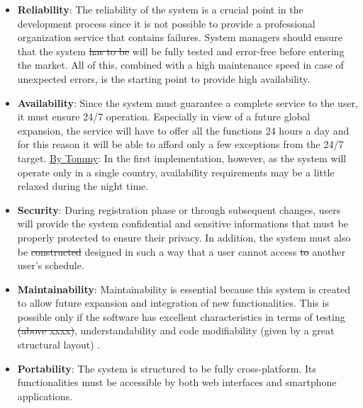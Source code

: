 \begin{itemize}
	\item \textbf{Reliability}: The reliability of the system is a crucial point in the development process since it is not possible to provide a professional organization service that contains failures. System managers should ensure that the system \st{has to be} will be fully tested and error-free before entering the market. All of this, combined with a high maintenance speed in case of unexpected errors, is the starting point to provide high availability.
	\item \textbf{Availability}: Since the system must guarantee a complete service to the user, it must ensure 24/7 operation. Especially in view of a future global expansion, the service will have to offer all the functions 24 hours a day and for this reason it will be able to afford only a few exceptions from the 24/7 target. \underline{By Tommy}: In the first implementation, however, as the system will operate only in a single country, availability requirements may be a little relaxed during the night time.
	\item \textbf{Security}: During registration phase or through subsequent changes, users will provide the system confidential and sensitive informations that must be properly protected to ensure their privacy. In addition, the system must also be \st{constructed} designed in such a way that a user cannot access \st{to} another user's schedule.
	\item \textbf{Maintainability}: Maintainability is essential because this system is created to allow future expansion and integration of new functionalities. This is possible only if the software has excellent characteristics in terms of testing \st{(above xxxx)}, understandability and code modifiability (given by a great structural layout) .
	\item \textbf{Portability}: The system is structured to be fully cross-platform. Its functionalities must be accessible by both web interfaces and smartphone applications.
\end{itemize}
